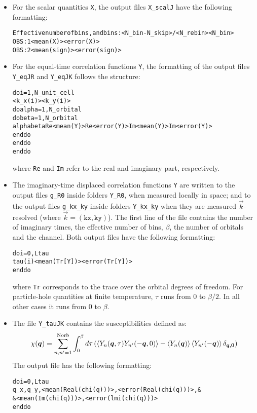 \begin{itemize}
	\item For the scalar quantities \texttt{X}, the output files  \texttt{X\_scalJ} have the following formatting:
	{\small \begin{alltt}
		Effective number of bins, and bins:  <N_bin - N_skip>/<N_rebin>  <N_bin>	
		OBS :  1    <mean(X)>      <error(X)>	
		OBS :  2    <mean(sign)>   <error(sign)>
	\end{alltt} }
	
	\item For the equal-time correlation functions \texttt{Y}, the formatting of the output files \texttt{Y\_eqJR} and \texttt{Y\_eqJK} follows the structure:
	{\small \begin{alltt}
		do i = 1, N_unit_cell
		   <k_x(i)>   <k_y(i)>
		   do alpha = 1, N_orbital
		      do beta  = 1, N_orbital
		         alpha  beta  Re<mean(Y)>  Re<error(Y)>  Im<mean(Y)>  Im<error(Y)>
		      enddo
		   enddo
		enddo
	\end{alltt} }
	where \texttt{Re} and \texttt{Im} refer to the real and imaginary part, respectively.
	
	\item The imaginary-time displaced correlation functions \texttt{Y} are written to the output files \texttt{g\_R0} inside folders \texttt{Y\_R0}, when measured locally in space; 
	and to the output files \texttt{g\_kx\_ky} inside folders \texttt{Y\_kx\_ky} when they are measured $\vec{k}$-resolved (where $\vec{k}=(\texttt{kx}, \texttt{ky})$). 
	The first line of the file contains the  number of  imaginary times, the effective number of bins,  $\beta$, the number of orbitals and  the channel.  
	Both output files have the following formatting:
	{\small \begin{alltt}
		do i = 0, Ltau
		   tau(i)   <mean( Tr[Y] )>   <error( Tr[Y])>
		enddo
	\end{alltt} }
	where \texttt{Tr} corresponds to the trace over the orbital degrees of freedom.   For particle-hole quantities at finite temperature,  $\tau$ runs from 
	$0$ to $\beta/2$.   In all other cases it runs from $0$ to $\beta$. 
	
	\item The file  \texttt{Y\_tauJK}    contains the susceptibilities defined as: 
	\begin{equation}
	  \chi(\boldsymbol{q})   =   \sum_{n,n'=1}^{\text{Norb}}  \int_{0}^{\beta}   d \tau    \left(   \left<   Y_n(\boldsymbol{q},\tau) Y_{n'}(-\boldsymbol{q},0) \right>  - \left<   Y_n(\boldsymbol{q}) \right> \left< Y_{n'}(-\boldsymbol{q}) \right> \delta_{\boldsymbol{q},\boldsymbol{0}}  \right) 
	\end{equation}
	The output file 	has the following formatting:
	{\small \begin{alltt}
		do i = 0, Ltau
		   q_x, q_y, <mean(Real(chi(q)) )>,  <error(Real(chi(q)))>, & 
		           & <mean(Im  (chi(q)) )>,  <error(lmi (chi(q)))>
		enddo
	\end{alltt} }


\end{itemize}
